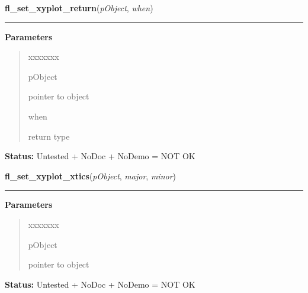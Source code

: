 \hspace{.8\funcindent}\begin{boxedminipage}{\funcwidth}

    \raggedright \textbf{fl\_set\_xyplot\_return}(\textit{pObject}, \textit{when})

    \vspace{-1.5ex}

    \rule{\textwidth}{0.5\fboxrule}
\setlength{\parskip}{2ex}
\setlength{\parskip}{1ex}
      \textbf{Parameters}
      \vspace{-1ex}

      \begin{quote}
        \begin{Ventry}{xxxxxxx}

          \item[pObject]

          pointer to object

          \item[when]

          return type

        \end{Ventry}

      \end{quote}

\textbf{Status:} Untested + NoDoc + NoDemo = NOT OK



    \end{boxedminipage}

    \label{xformslib:library:fl_set_xyplot_xtics}

    \vspace{0.5ex}

\hspace{.8\funcindent}\begin{boxedminipage}{\funcwidth}

    \raggedright \textbf{fl\_set\_xyplot\_xtics}(\textit{pObject}, \textit{major}, \textit{minor})

    \vspace{-1.5ex}

    \rule{\textwidth}{0.5\fboxrule}
\setlength{\parskip}{2ex}
\setlength{\parskip}{1ex}
      \textbf{Parameters}
      \vspace{-1ex}

      \begin{quote}
        \begin{Ventry}{xxxxxxx}

          \item[pObject]

          pointer to object

        \end{Ventry}

      \end{quote}

\textbf{Status:} Untested + NoDoc + NoDemo = NOT OK



    \end{boxedminipage}

